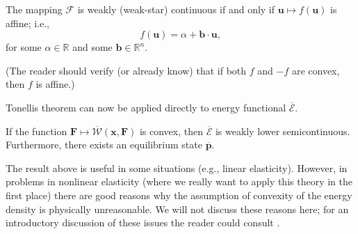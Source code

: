 \begin{Corollary}
\label{cor:tonelli-affine-integrand-weak-continuity}
The mapping $\mathcal{F}$ is weakly (weak-star) continuous if and only if $\bm{u}\mapsto f(\bm{u})$ is affine; i.e.,
\begin{equation}\label{eq:weak-continuity-integral-affine-integrand}
f(\bm{u})=\alpha+\bm{b}\cdot\bm{u},
\end{equation}
for some $\alpha\in\mathbb{R}$ and some $\bm{b}\in\mathbb{R}^n$.
\end{Corollary}

(The reader should verify (or already know) that if both $f$ and $-f$ are convex, then $f$ is affine.)

Tonelli\textquotesingle s theorem can now be applied directly to energy functional $\overline{\mathcal{E}}$.

\begin{Corollary}
\label{cor:convex-elasticity-energy-equilibrium-existence}
If the function $\bm{F}\mapsto\overline{\mathcal{W}}(\bm{x},\bm{F})$ is convex, then $\overline{\mathcal{E}}$ is weakly lower semicontinuous. Furthermore, there exists an equilibrium state $\overline{\bm{p}}$.
\end{Corollary}

\begingroup
\renewcommand{\endProof}{\par\nobreak\hfill$\blacksquare$\par\vspace{0.1cm}}
\endgroup

The result above is useful in some situations (e.g., linear elasticity). However, in problems in nonlinear elasticity (where we really want to apply this theory in the first place) there are good reasons why the assumption of convexity of the energy density is physically unreasonable. We will not discuss these reasons here; for an introductory discussion of these issues the reader could consult \cite{Ba}.

